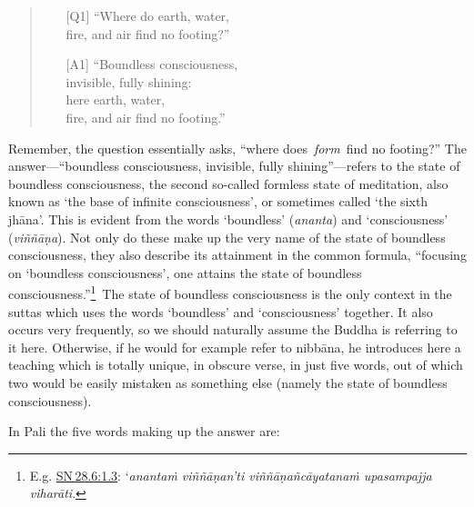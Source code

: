 \documentclass[10pt, openright]{book}
\begin{document}
\begin{quote}


\begin{itemize}

\item[{[Q1]}]“Where do earth, water, \\ fire, and air find no footing?”


\item[{[A1]}]“Boundless consciousness, \\ invisible, fully shining: \\ here earth, water, \\ fire, and air find no footing.”

\end{itemize}

\end{quote}
Remember, the question essentially asks, “where does \textit{form} find no footing?” The answer—“boundless consciousness, invisible, fully shining”—refers to the state of boundless consciousness, the second so-called formless state of meditation, also known as ‘the base of infinite consciousness’, or sometimes called ‘the sixth jhāna’. This is evident from the words ‘boundless’ (\textit{ananta}) and ‘consciousness’ (\textit{viññāṇa}). Not only do these make up the very name of the state of boundless consciousness, they also describe its attainment in the common formula, “focusing on ‘boundless consciousness’, one attains the state of boundless consciousness.”\footnote {E.g. \href{https://suttacentral.net/sn28.6/en/sujato\#1.3}{SN 28.6:1.3}: ‘\textit{anantaṁ viññāṇan’ti viññāṇañcāyatanaṁ upasampajja viharāti}.} The state of boundless consciousness is the only context in the suttas which uses the words ‘boundless’ and ‘consciousness’ together. It also occurs very frequently, so we should naturally assume the Buddha is referring to it here. Otherwise, if he would for example refer to nibbāna, he introduces here a teaching which is totally unique, in obscure verse, in just five words, out of which two would be easily mistaken as something else (namely the state of boundless consciousness).


In Pali the five words making up the answer are:
\end{document}
